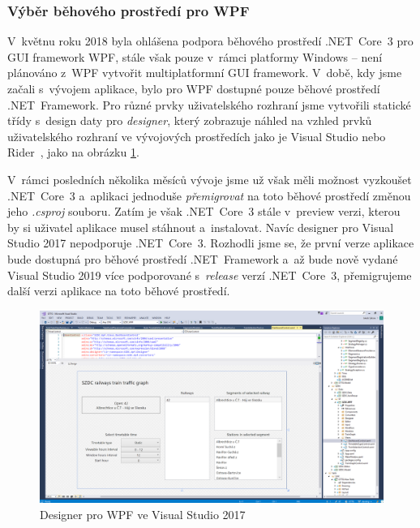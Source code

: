 \subsubsection{Výběr běhového prostředí pro WPF}
V~květnu roku 2018 byla ohlášena podpora běhového prostředí .NET~Core~3 pro GUI framework WPF, stále však pouze v~rámci platformy Windows -- není plánováno z~WPF vytvořit multiplatformní GUI framework. V~době, kdy jsme začali s~vývojem aplikace, bylo pro WPF dostupné pouze běhové prostředí \linebreak .NET~Framework. Pro různé prvky uživatelského rozhraní jsme vytvořili statické třídy s~design daty pro \textit{designer}, který zobrazuje náhled na vzhled prvků uživatelského rozhraní ve vývojových prostředích jako je Visual Studio nebo Rider~\cite{Rider}, jako na obrázku \ref{fig:kap6:gui_wpf_designer}.

V~rámci posledních několika měsíců vývoje jsme už však měli možnost vyzkoušet .NET~Core~3 a~aplikaci jednoduše \textit{přemigrovat} na toto běhové prostředí změnou jeho \textit{.csproj} souboru. Zatím je však .NET~Core~3 stále v~preview verzi, kterou by si uživatel aplikace musel stáhnout a~instalovat. Navíc designer pro Visual Studio 2017 nepodporuje .NET~Core~3. Rozhodli jsme se, že první verze aplikace bude dostupná pro běhové prostředí .NET~Framework a~až bude nově vydané Visual Studio 2019 více podporované s~\textit{release} verzí .NET~Core~3, přemigrujeme další verzi aplikace na toto běhové prostředí.

\begin{figure}[!hbt]
	\centering
	\includegraphics[width=\textwidth]{../img/kap6_designer_wpf}
	\caption{Designer pro WPF ve Visual Studio 2017}
	\label{fig:kap6:gui_wpf_designer}
\end{figure}

\newpage
